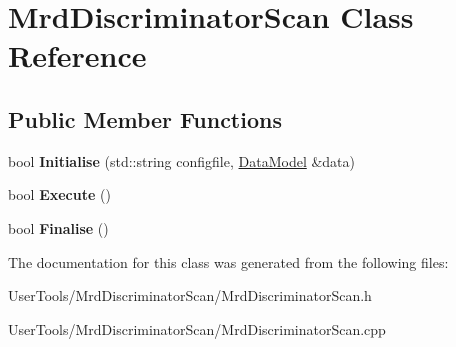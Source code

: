 \hypertarget{classMrdDiscriminatorScan}{
\section{MrdDiscriminatorScan Class Reference}
\label{classMrdDiscriminatorScan}
}
\subsection*{Public Member Functions}
\begin{DoxyCompactItemize}
\item 
\hypertarget{classMrdDiscriminatorScan_abaa4b337b0df9e14620ae6f9b8794b1b}{
bool {\bfseries Initialise} (std::string configfile, \hyperlink{classDataModel}{DataModel} \&data)}
\label{classMrdDiscriminatorScan_abaa4b337b0df9e14620ae6f9b8794b1b}

\item 
\hypertarget{classMrdDiscriminatorScan_a37ebf1bcfc1bdaafe1afddea5bacbd67}{
bool {\bfseries Execute} ()}
\label{classMrdDiscriminatorScan_a37ebf1bcfc1bdaafe1afddea5bacbd67}

\item 
\hypertarget{classMrdDiscriminatorScan_a73fe6971470c0858f87051e2ab853e18}{
bool {\bfseries Finalise} ()}
\label{classMrdDiscriminatorScan_a73fe6971470c0858f87051e2ab853e18}

\end{DoxyCompactItemize}


The documentation for this class was generated from the following files:\begin{DoxyCompactItemize}
\item 
UserTools/MrdDiscriminatorScan/MrdDiscriminatorScan.h\item 
UserTools/MrdDiscriminatorScan/MrdDiscriminatorScan.cpp\end{DoxyCompactItemize}
